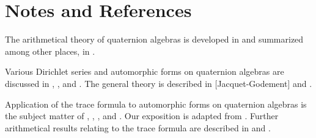 \section*{Notes and References}


The arithmetical theory of quaternion algebras is developed in \cite{Eichler} and summarized among other places, in \cite{Eichler2}.

Various Dirichlet series and automorphic forms on quaternion algebras are discussed in \cite{Shimura3}, \cite{Tamagawa}, \cite{Godement4} and \cite{Selberg}. The general theory is described in [Jacquet-Godement] and \cite{JacquetLanglands}.

Application of the trace formula to automorphic forms on quaternion algebras is the subject matter of \cite{Eichler3, Eichler4}, \cite{Shimizu}, \cite{Shimizu2}, and \cite{JacquetLanglands}. Our exposition is adapted from \cite{JacquetLanglands}. Further arithmetical results relating to the trace formula are described in \cite{Mautner2} and \cite{Langlands6}.
